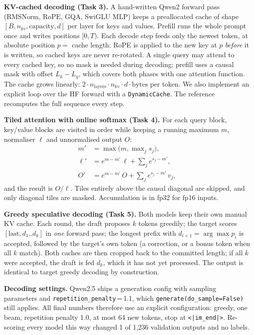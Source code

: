 \documentclass[conference]{IEEEtran}
\begin{document}
\textbf{KV-cached decoding (Task 3).} A hand-written Qwen2 forward pass (RMSNorm, RoPE, GQA, SwiGLU MLP) keeps a preallocated cache of shape $[B, n_{kv}, \text{capacity}, d]$ per layer for keys and values. Prefill runs the whole prompt once and writes positions $[0,T)$. Each decode step feeds only the newest token, at absolute position $p = $ cache length: RoPE is applied to the new key at $p$ \emph{before} it is written, so cached keys are never re-rotated. A single query may attend to every cached key, so no mask is needed during decoding; prefill uses a causal mask with offset $L_k - L_q$, which covers both phases with one attention function. The cache grows linearly: $2 \cdot n_\text{layers} \cdot n_{kv} \cdot d \cdot \text{bytes}$ per token. We also implement an explicit loop over the HF forward with a \texttt{DynamicCache}. The reference recomputes the full sequence every step.

\textbf{Tiled attention with online softmax (Task 4).} For each query block, key/value blocks are visited in order while keeping a running maximum $m$, normaliser $\ell$ and unnormalised output $O$:
\begin{equation}
\begin{aligned}
m' &= \max\big(m, \max\nolimits_j s_j\big),\\
\ell' &= e^{m-m'}\,\ell + \textstyle\sum_j e^{s_j-m'},\\
O' &= e^{m-m'}\,O + \textstyle\sum_j e^{s_j-m'}\, v_j,
\end{aligned}
\end{equation}
and the result is $O/\ell$. Tiles entirely above the causal diagonal are skipped, and only diagonal tiles are masked. Accumulation is in fp32 for fp16 inputs.

\textbf{Greedy speculative decoding (Task 5).} Both models keep their own manual KV cache. Each round, the draft proposes $k$ tokens greedily; the target scores $[\text{last}, d_1..d_k]$ in \emph{one} forward pass; the longest prefix with $d_{i+1} = \arg\max p_i$ is accepted, followed by the target's own token (a correction, or a bonus token when all $k$ match). Both caches are then cropped back to the committed length; if all $k$ were accepted, the draft is fed $d_k$, which it has not yet processed. The output is identical to target greedy decoding by construction.

\textbf{Decoding settings.} Qwen2.5 ships a generation config with sampling parameters and \texttt{repetition\_penalty}\,=\,1.1, which \texttt{generate(do\_sample=False)} still applies. All final numbers therefore use an explicit configuration: greedy, one beam, repetition penalty 1.0, at most 64 new tokens, stop at \texttt{<|im\_end|>}. Re-scoring every model this way changed 1 of 1,236 validation outputs and no labels.
\end{document}
